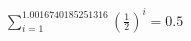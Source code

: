 \documentclass[preview]{standalone}
\begin{document}
\begin{align*}
\sum_{i=1}^{1.0016740185251316} (\frac{1}{2})^i = {0.5}
\end{align*}
\end{document}
